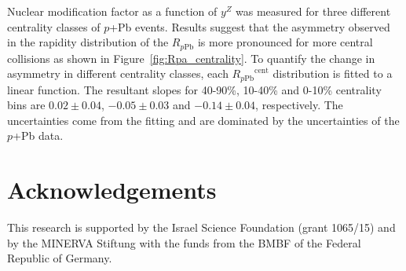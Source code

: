 \documentclass[3p,times,twocolumn]{elsarticle}
\newcommand*{\pPb}{\ensuremath{p}+Pb\xspace}
\newcommand*{\Zboson}{\ensuremath{Z}\xspace}
\newcommand*{\pp}{\ensuremath{pp}\xspace}
\newcommand{\yZ}{\mbox{$y^{Z}$}\xspace}
\newcommand*{\RpPb}{\ensuremath{R_{p\mathrm{Pb}}}\xspace}
\begin{document}
Nuclear modification factor as a function of \yZ was measured for three different centrality classes of \pPb events. Results suggest that the asymmetry observed in the rapidity distribution of the \RpPb is more pronounced for more central collisions as shown in Figure~\ref{fig:Rpa_centrality}.  To quantify the change in asymmetry in different centrality classes, each $\RpPb^{\text{cent}}$ distribution is fitted to a linear function.  The resultant slopes for 40-90\%, 10-40\% and 0-10\% centrality bins are $0.02 \pm 0.04$, $-0.05 \pm 0.03$ and $-0.14 \pm 0.04$, respectively.  The uncertainties come from the fitting and are dominated by the uncertainties of the \pPb data. \par


\section*{Acknowledgements}
This research is supported by the Israel Science Foundation (grant 1065/15) and by the MINERVA Stiftung with the funds from the BMBF of the Federal Republic of Germany.





%









\end{document}
